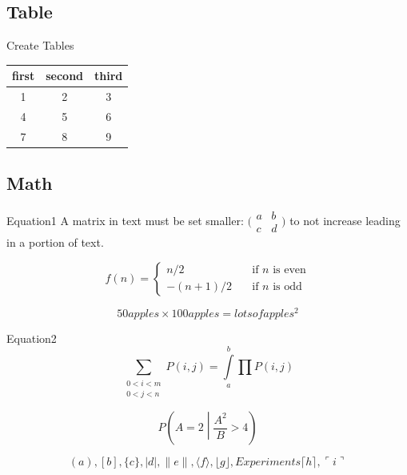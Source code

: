 \subsection{Table}

\begin{frame}{Create Tables}
    \begin{center}
        \begin{table}[!t]  
            \begin{tabular}{ccc}  
                \toprule   
                first&second&third\\ 
                \midrule       
                1 & 2 & 3 \\ 
                4 & 5 & 6 \\ 
                7 & 8 & 9 \\
                \bottomrule  
            \end{tabular}
        \end{table}
    \end{center}
\end{frame}

\subsection{Math}

\begin{frame}{Equation1}
    A matrix in text must be set  smaller:
    $\bigl(\begin{smallmatrix}
    a&b \\ c&d
    \end{smallmatrix} \bigr)$
    to not increase leading in a portion of text.

    \[ f(n) =
    \begin{cases}
        n/2       & \quad \text{if } n \text{ is even}\\
        -(n+1)/2  & \quad \text{if } n \text{ is odd}
    \end{cases}
    \]

    $$50 apples \times 100 apples = lots of apples^2$$
\end{frame}

\begin{frame}{Equation2}
    $$\sum_{\substack{0<i<m \\ 0<j<n }} 
      P(i,j)=\int\limits_a^b\prod P(i,j)$$

    $$P\left(A=2\middle|\frac{A^2}{B}>4\right)$$

    $$( a ), [ b ], \{ c \}, | d |, \| e \|,
    \langle f \rangle, \lfloor g \rfloor,Experiments
    \lceil h \rceil, \ulcorner i \urcorner$$
    
\end{frame}


